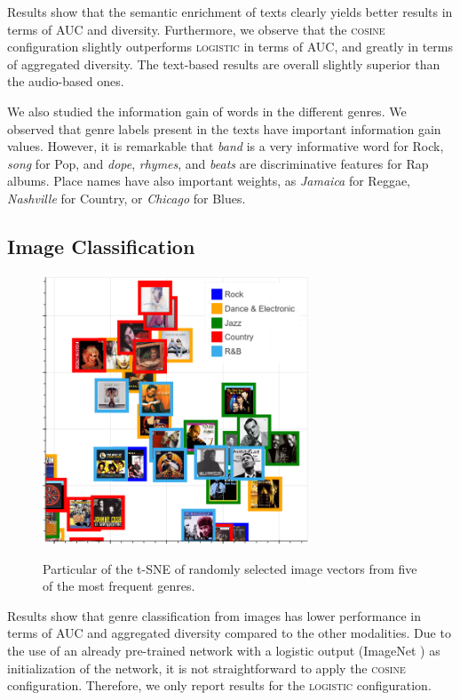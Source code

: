 Results show that the semantic enrichment of texts clearly yields better results in terms of AUC and diversity.
Furthermore, we observe that the \textsc{cosine} configuration slightly outperforms \textsc{logistic} in terms of AUC, and greatly in terms of aggregated diversity. 
The text-based results are overall slightly superior than the audio-based ones. 

We also studied the information gain of words in the different genres. We observed that genre labels present in the texts have important information gain values. However, it is remarkable that \textit{band} is a very informative word for Rock, \textit{song} for Pop, and \textit{dope}, \textit{rhymes}, and \textit{beats} are discriminative features for Rap albums. Place names have also important weights, as \textit{Jamaica} for Reggae, \textit{Nashville} for Country, or \textit{Chicago} for Blues.%


\subsection{Image Classification}\label{sec:multi-class:imageexp}


\begin{figure}
\centering
\includegraphics[height=8cm,keepaspectratio]{ch09_multi-class_pics/visual_zoom2.png} \\ 
\caption{Particular of the t-SNE of randomly selected image vectors from five of the most frequent genres.}
\label{fig:tsne_visual}
\end{figure}

Results show that genre classification from images has lower performance in terms of AUC and aggregated diversity compared to the other modalities. Due to the use of an already pre-trained network with a logistic output (ImageNet \cite{ILSVRC15}) as initialization of the network, it is not straightforward to apply the \textsc{cosine} configuration. Therefore, we only report results for the \textsc{logistic} configuration.

